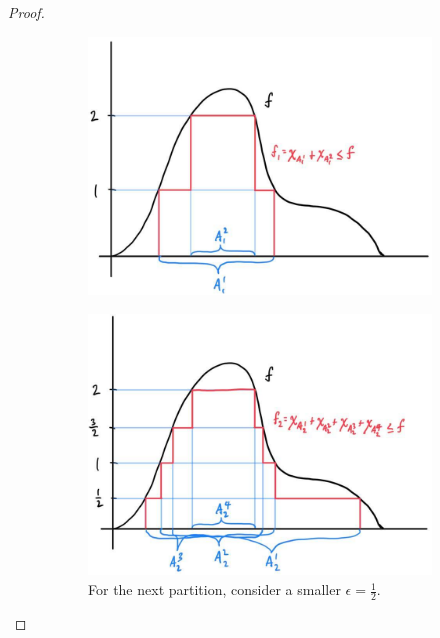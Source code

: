 \begin{proof}
    \begin{figure}[H]
      \centering
      \begin{subfigure}[b]{0.48\textwidth}
        \centering
          \includegraphics[scale=0.23]{img/simple_approximation_1.jpg}
        \caption{}
      \end{subfigure}
      \hfill 
      \begin{subfigure}[b]{0.48\textwidth}
        \centering
        \includegraphics[scale=0.23]{img/simple_approximation_2.jpg}
        \caption{For the next partition, consider a smaller $\epsilon = \frac{1}{2}$. }
      \end{subfigure}
      \caption{}
    \end{figure}


\end{proof}
